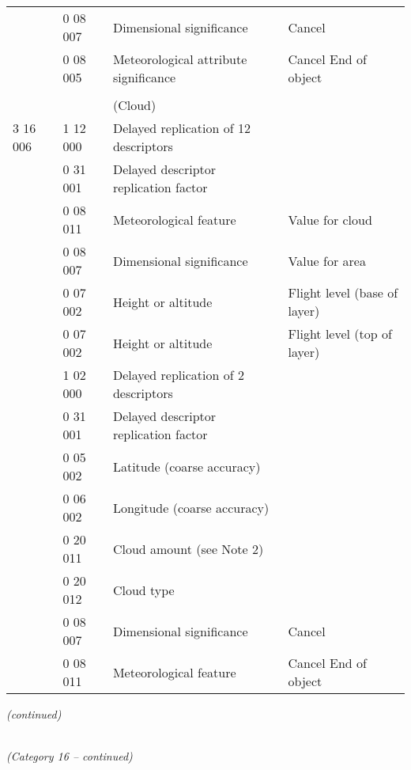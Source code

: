 \begin{longtable}[]{@{}llll@{}}
& 0 08 007 & Dimensional significance & Cancel\tabularnewline
& 0 08 005 & Meteorological attribute significance & Cancel \textbf{\textbar{}} End of object\tabularnewline
& & &\tabularnewline
& & (Cloud) &\tabularnewline
3 16 006 & 1 12 000 & Delayed replication of 12 descriptors &\tabularnewline
& 0 31 001 & Delayed descriptor replication factor &\tabularnewline
& 0 08 011 & Meteorological feature & Value for cloud\tabularnewline
& 0 08 007 & Dimensional significance & Value for area\tabularnewline
& 0 07 002 & Height or altitude & Flight level (base of layer)\tabularnewline
& 0 07 002 & Height or altitude & Flight level (top of layer)\tabularnewline
& 1 02 000 & Delayed replication of 2 descriptors &\tabularnewline
& 0 31 001 & Delayed descriptor replication factor &\tabularnewline
& 0 05 002 & Latitude (coarse accuracy) &\tabularnewline
& 0 06 002 & Longitude (coarse accuracy) &\tabularnewline
& 0 20 011 & Cloud amount (see Note 2) &\tabularnewline
& 0 20 012 & Cloud type &\tabularnewline
& 0 08 007 & Dimensional significance & Cancel\tabularnewline
& 0 08 011 & Meteorological feature & Cancel \textbf{\textbar{}} End of object\tabularnewline
\bottomrule
\end{longtable}

\emph{(continued)}

\emph{\\
(Category 16 -- continued)}

